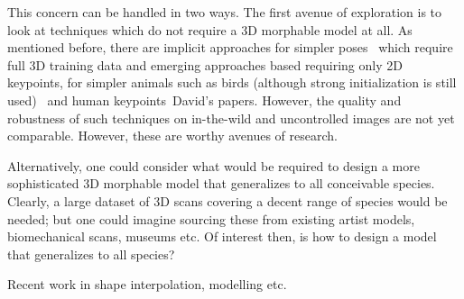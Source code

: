 This concern can be handled in two ways. The first avenue of exploration is to look at techniques which do not require a 3D morphable model at all. As mentioned before, there are implicit approaches for simpler poses~ which require full 3D training data and emerging approaches based requiring only 2D keypoints, for simpler animals such as birds (although strong initialization is still used)~ and human keypoints~\cite{}{David's papers}. However, the quality and robustness of such techniques on in-the-wild and uncontrolled images are not yet comparable. However, these are worthy avenues of research.

Alternatively, one could consider what would be required to design a more sophisticated 3D morphable model that generalizes to all conceivable species. Clearly, a large dataset of 3D scans covering a decent range of species would be needed; but one could imagine sourcing these from existing artist models, biomechanical scans, museums etc. Of interest then, is how to design a model that generalizes to all species?

Recent work in shape interpolation, modelling etc. 









